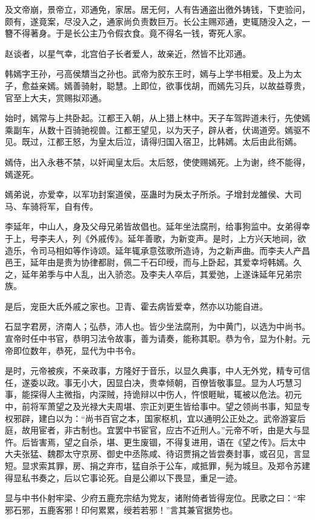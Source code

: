 \documentclass[]{article}
\begin{document}
及文帝崩，景帝立，邓通免，家居。居无何，人有告通盗出徼外铸钱，下吏验问，颇有，遂竟案，尽没入之，通家尚负责数巨万。长公主赐邓通，吏辄随没入之，一簪不得著身。于是长公主乃令假衣食。竟不得名一钱，寄死人家。

赵谈者，以星气幸，北宫伯子长者爱人，故亲近，然皆不比邓通。

韩嫣字王孙，弓高侯穨当之孙也。武帝为胶东王时，嫣与上学书相爱。及上为太子，愈益亲嫣。嫣善骑射，聪慧。上即位，欲事伐胡，而嫣先习兵，以故益尊贵，官至上大夫，赏赐拟邓通。

始时，嫣常与上共卧起。江都王入朝，从上猎上林中。天子车驾跸道未行，先使嫣乘副车，从数十百骑驰视兽。江都王望见，以为天子，辟从者，伏谒道旁。嫣驱不见。既过，江都王怒，为皇太后泣，请得归国入宿卫，比韩嫣。太后由此衔嫣。

嫣侍，出入永巷不禁，以奸闻皇太后。太后怒，使使赐嫣死。上为谢，终不能得，嫣遂死。

嫣弟说，亦爱幸，以军功封案道侯，巫蛊时为戾太子所杀。子增封龙雒侯、大司马、车骑将军，自有传。

李延年，中山人，身及父母兄弟皆故倡也。延年坐法腐刑，给事狗监中。女弟得幸于上，号李夫人，列《外戚传》。延年善歌，为新变声。是时，上方兴天地祠，欲造乐，令司马相如等作诗颂。延年辄承意弦歌所造诗，为之新声曲。而李夫人产昌邑王，延年由是贵为协律都尉，佩二千石印绶，而与上卧起，其爱幸埒韩嫣。久之，延年弟季与中人乱，出入骄恣。及李夫人卒后，其爱弛，上遂诛延年兄弟宗族。

是后，宠臣大氐外戚之家也。卫青、霍去病皆爱幸，然亦以功能自进。

石显字君房，济南人；弘恭，沛人也。皆少坐法腐刑，为中黄门，以选为中尚书。宣帝时任中书官，恭明习法令故事，善为请奏，能称其职。恭为令，显为仆射。元帝即位数年，恭死，显代为中书令。

是时，元帝被疾，不亲政事，方隆好于音乐，以显久典事，中人无外党，精专可信任，遂委以政。事无小大，因显白决，贵幸倾朝，百僚皆敬事显。显为人巧慧习事，能探得人主微指，内深贼，持诡辩以中伤人，忤恨睚眦，辄被以危法。初元中，前将军萧望之及光禄大夫周堪、宗正刘更生皆给事中。望之领尚书事，知显专权邪辟，建白以为：``尚书百官之本，国家枢机，宜以通明公正处之。武帝游宴后庭，故用宦者，非古制也。宜罢中书宦官，应古不近刑人。''元帝不听，由是大与显忤。后皆害焉，望之自杀，堪、更生废锢，不得复进用，语在《望之传》。后太中大夫张猛、魏郡太守京房、御史中丞陈咸、待诏贾捐之皆尝奏封事，或召见，言显短。显求索其罪，房、捐之弃市，猛自杀于公车，咸抵罪，髡为城旦。及郑令苏建得显私书奏之，后以它事论死。自是公卿以下畏显，重足一迹。

显与中书仆射牢梁、少府五鹿充宗结为党友，诸附倚者皆得宠位。民歌之曰：``牢邪石邪，五鹿客邪！印何累累，绶若若邪！''言其兼官据势也。
\end{document}
